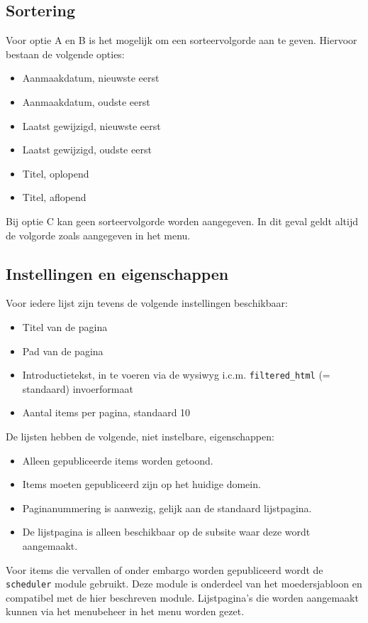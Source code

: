 \documentclass{article}
\begin{document}
\subsection{Sortering}
Voor optie A en B is het mogelijk om een sorteervolgorde aan te geven. Hiervoor bestaan de volgende opties:
\begin{itemize}
\item Aanmaakdatum, nieuwste eerst
\item Aanmaakdatum, oudste eerst
\item Laatst gewijzigd, nieuwste eerst
\item Laatst gewijzigd, oudste eerst
\item Titel, oplopend
\item Titel, aflopend
\end{itemize}
Bij optie C kan geen sorteervolgorde worden aangegeven. In dit geval geldt altijd de volgorde zoals aangegeven in het menu.

\subsection{Instellingen en eigenschappen}
Voor iedere lijst zijn tevens de volgende instellingen beschikbaar:
\begin{itemize}
\item Titel van de pagina
\item Pad van de pagina
\item Introductietekst, in te voeren via de wysiwyg i.c.m. \texttt{filtered\_html} (= standaard) invoerformaat
\item Aantal items per pagina, standaard 10
\end{itemize}
De lijsten hebben de volgende, niet instelbare, eigenschappen:
\begin{itemize}
\item Alleen gepubliceerde items worden getoond.
\item Items moeten gepubliceerd zijn op het huidige domein.
\item Paginanummering is aanwezig, gelijk aan de standaard lijstpagina.
\item De lijstpagina is alleen beschikbaar op de subsite waar deze wordt aangemaakt.
\end{itemize}
Voor items die vervallen of onder embargo worden gepubliceerd wordt de \texttt{scheduler} module gebruikt. Deze module is onderdeel van het moedersjabloon en compatibel met de hier beschreven module.
Lijstpagina's die worden aangemaakt kunnen via het menubeheer in het menu worden gezet.
\end{document}
